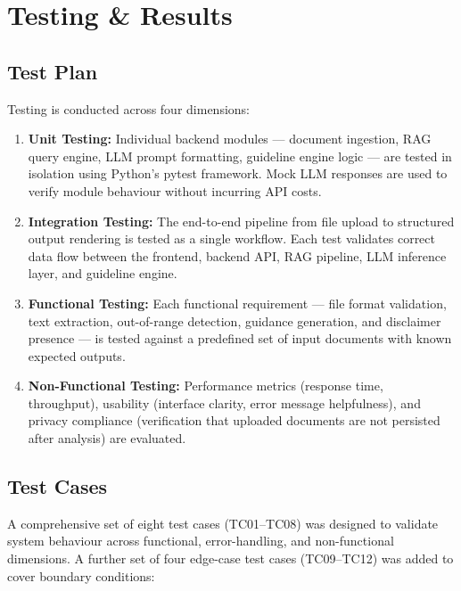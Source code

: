 \chapter{Testing \& Results}

\section{Test Plan}
Testing is conducted across four dimensions:

\begin{enumerate}
    \item \textbf{Unit Testing:} Individual backend modules --- document ingestion, RAG query engine, LLM prompt formatting, guideline engine logic --- are tested in isolation using Python's pytest framework. Mock LLM responses are used to verify module behaviour without incurring API costs.
    \item \textbf{Integration Testing:} The end-to-end pipeline from file upload to structured output rendering is tested as a single workflow. Each test validates correct data flow between the frontend, backend API, RAG pipeline, LLM inference layer, and guideline engine.
    \item \textbf{Functional Testing:} Each functional requirement --- file format validation, text extraction, out-of-range detection, guidance generation, and disclaimer presence --- is tested against a predefined set of input documents with known expected outputs.
    \item \textbf{Non-Functional Testing:} Performance metrics (response time, throughput), usability (interface clarity, error message helpfulness), and privacy compliance (verification that uploaded documents are not persisted after analysis) are evaluated.
\end{enumerate}

\section{Test Cases}
A comprehensive set of eight test cases (TC01--TC08) was designed to validate system behaviour across functional, error-handling, and non-functional dimensions. A further set of four edge-case test cases (TC09--TC12) was added to cover boundary conditions:

